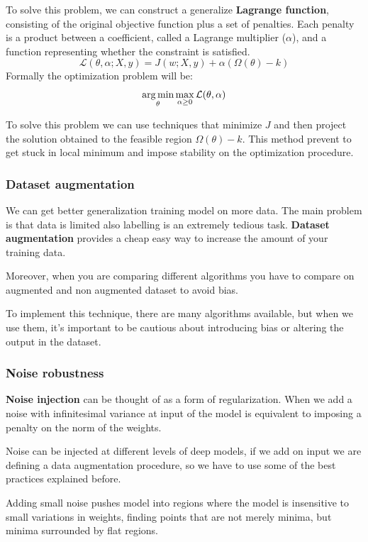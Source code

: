 To solve this problem, we can construct a generalize \textbf{Lagrange function},
consisting of the original objective function plus a set of penalties. Each
penalty is a product between a coefficient, called a Lagrange multiplier ($\alpha$),
and a function representing whether the constraint is satisfied.
\begin{equation}
    \mathcal{L}(\theta, \alpha; X,y) = J(w;X,y)+ \alpha(\Omega(\theta)-k)
\end{equation}
Formally the optimization problem will be:
\begin{equation}
    \operatorname*{arg\,min}_\theta \max_{\alpha \geq 0} \mathcal{L}(\theta, \alpha)
\end{equation}

To solve this problem we can use techniques that minimize $J$ and then project
the solution obtained to the feasible region $\Omega(\theta) - k$. This method
prevent to get stuck in local minimum and impose stability on the optimization
procedure.
\subsubsection{Dataset augmentation}
We can get better generalization training model on more data. The main problem is
that data is limited also labelling is an extremely tedious task. \textbf{Dataset
    augmentation} provides a cheap easy way to increase the amount of your
training data.

Moreover, when you are comparing different algorithms you have to compare on
augmented and non augmented dataset to avoid bias.

To implement this technique, there are many algorithms available, but when we
use them, it's important to be cautious about introducing bias or altering the
output in the dataset.
\subsubsection{Noise robustness}
\textbf{Noise injection} can be thought of as a form of regularization. When we
add a noise with infinitesimal variance at input of the model is equivalent to
imposing a penalty on the norm of the weights.

Noise can be injected at different levels of deep models, if we add on input we
are defining a data augmentation procedure, so we have to use some of the best
practices explained before.

Adding small noise pushes model into regions where the model is insensitive to
small variations in weights, finding points that are not merely minima, but
minima surrounded by flat regions.

